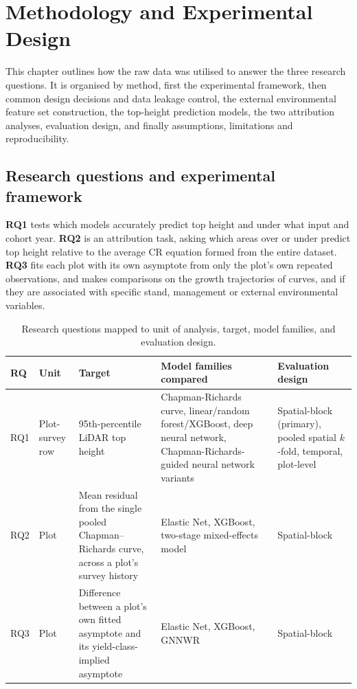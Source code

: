 \documentclass[11pt,a4paper]{report}
\begin{document}
\newcommand{\fc}[1]{\textcolor{red}{[FactC: #1]}}
\newcommand{\ct}[1]{\textcolor{orange}{[CITE: #1]}}
\newcommand{\app}[1]{\textcolor{blue}{[APP: #1]}}
\newcommand{\sr}[1]{\textcolor{teal}{[Sreword: #1]}}
\newcommand{\fig}[1]{\textcolor{purple}{[FIG: #1]}}

\chapter{Methodology and Experimental Design}
\label{ch:methodology}

This chapter outlines how the raw data was utilised to answer the three research questions. It is organised by method, first the experimental framework, then common design decisions and data leakage control, the external environmental feature set construction, the top-height prediction models, the two attribution analyses, evaluation design, and finally assumptions, limitations and reproducibility.

\section{Research questions and experimental framework}
\textbf{RQ1} tests which models accurately predict top height and under what input and cohort year. \textbf{RQ2} is an attribution task, asking which areas over or under predict top height relative to the average CR equation formed from the entire dataset. \textbf{RQ3} fits each plot with its own asymptote from only the plot's own repeated observations, and makes comparisons on the growth trajectories of curves, and if they are associated with specific stand, management or external environmental variables.

\begin{table}[!htbp]
\scriptsize
\renewcommand{\arraystretch}{1.2}
\begin{tabular}{p{0.8cm}p{1.4cm}p{3.3cm}p{4.2cm}p{2.9cm}}
\toprule
RQ & Unit & Target & Model families compared & Evaluation design \\
\midrule
RQ1 & Plot-survey row & 95th-percentile LiDAR top height & Chapman-Richards curve,
linear/random forest/XGBoost, deep neural network, Chapman-Richards-guided neural network
variants & Spatial-block (primary), pooled spatial $k$-fold, temporal, plot-level \\
RQ2 & Plot & Mean residual from the single pooled Chapman--Richards curve, across a plot's survey
history & Elastic Net, XGBoost, two-stage mixed-effects model & Spatial-block \\
RQ3 & Plot & Difference between a plot's own fitted asymptote and its yield-class-implied
asymptote & Elastic Net, XGBoost, GNNWR & Spatial-block \\
\bottomrule
\end{tabular}
\caption{Research questions mapped to unit of analysis, target, model families, and evaluation
design.}
\label{tab:rq-framework}
\end{table}
\end{document}
